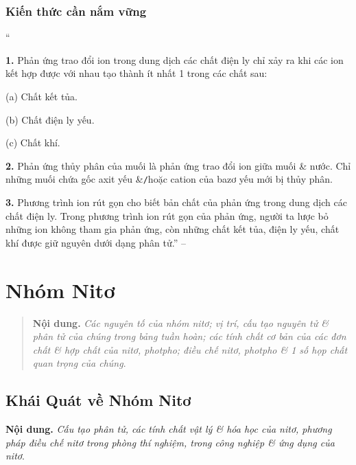\documentclass[oneside]{book}
\numberwithin{equation}{section}
\begin{document}
\subsection{Kiến thức cần nắm vững}
``\begin{enumerate*}
	\item[\textbf{1.}] Phản ứng trao đổi ion trong dung dịch các chất điện ly chỉ xảy ra khi các ion kết hợp được với nhau tạo thành ít nhất 1 trong các chất sau:
	\begin{enumerate*}
		\item[(a)] Chất kết tủa.
		\item[(b)] Chất điện ly yếu.
		\item[(c)] Chất khí.
	\end{enumerate*}
	\item[\textbf{2.}] Phản ứng thủy phân của muối là phản ứng trao đổi ion giữa muối \& nước. Chỉ những muối chứa gốc axit yếu \&\texttt{/}hoặc cation của bazơ yếu mới bị thủy phân.
	\item[\textbf{3.}] Phương trình ion rút gọn cho biết bản chất của phản ứng trong dung dịch các chất điện ly. Trong phương trình ion rút gọn của phản ứng, người ta lược bỏ những ion không tham gia phản ứng, còn những chất kết tủa, điện ly yếu, chất khí được giữ nguyên dưới dạng phân tử.'' -- \cite[p. 30]{SGK_Hoa_Hoc_11_nang_cao}
\end{enumerate*}


\chapter{Nhóm Nitơ}

\begin{quotation}
	\textbf{Nội dung.} \textit{Các nguyên tố của nhóm nitơ; vị trí, cấu tạo nguyên tử \& phân tử của chúng trong bảng tuần hoàn; các tính chất cơ bản của các đơn chất \& hợp chất của nitơ, photpho; điều chế nitơ, photpho \& 1 số họp chất quan trọng của chúng}.
\end{quotation}

\section{Khái Quát về Nhóm Nitơ}
\textbf{Nội dung.} \textit{Cấu tạo phân tử, các tính chất vật lý \& hóa học của nitơ, phương pháp điều chế nitơ trong phòng thí nghiệm, trong công nghiệp \& ứng dụng của nitơ}.
\end{document}
